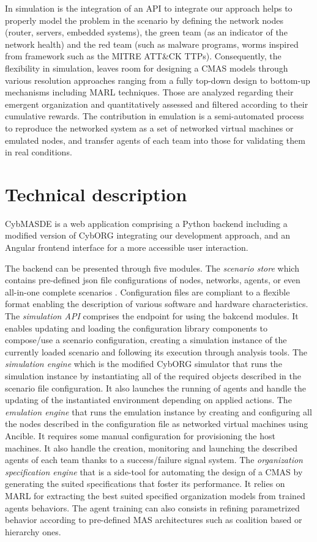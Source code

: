 \documentclass[sigconf]{aamas}
\begin{document}
In simulation is the integration of an API to integrate our approach helps to properly model the problem in the scenario by defining the network nodes (router, servers, embedded systems), the green team (as an indicator of the network health) and the red team (such as malware programs, worms inspired from framework such as the MITRE ATT\&CK TTPs). Consequently, the flexibility in simulation, leaves room for designing a CMAS models through various resolution approaches ranging from a fully top-down design to bottom-up mechanisms including MARL techniques. Those are analyzed regarding their emergent organization and quantitatively assessed and filtered according to their cumulative rewards.
The contribution in emulation is a semi-automated process to reproduce the networked system as a set of networked virtual machines or emulated nodes, and transfer agents of each team into those for validating them in real conditions.


\section{Technical description}

CybMASDE is a web application comprising a Python backend including a modified version of CybORG integrating our development approach, and an Angular frontend interface for a more accessible user interaction.

The backend can be presented through five modules.
The \textit{scenario store} which contains pre-defined json file configurations of nodes, networks, agents, or even all-in-one complete scenarios . Configuration files are compliant to a flexible format enabling the description of various software and hardware characteristics. 
The \textit{simulation API} comprises the endpoint for using the bakcend modules. It enables updating and loading the configuration library components to compose/use a scenario configuration, creating a simulation instance of the currently loaded scenario and following its execution through analysis tools.
The \textit{simulation engine} which is the modified CybORG simulator that runs the simulation instance by instantiating all of the required objects described in the scenario file configuration. It also launches the running of agents and handle the updating of the instantiated environment depending on applied actions.
The \textit{emulation engine} that runs the emulation instance by creating and configuring all the nodes described in the configuration file as networked virtual machines using Ancible. It requires some manual configuration for provisioning the host machines. It also handle the creation, monitoring and launching the described agents of each team thanks to a success/failure signal system.
The \textit{organization specification engine} that is a side-tool for automating the design of a CMAS by generating the suited specifications that foster its performance. It relies on MARL for extracting the best suited specified organization models from trained agents behaviors. The agent training can also consists in refining parametrized behavior according to pre-defined MAS architectures such as coalition based or hierarchy ones.
\end{document}
